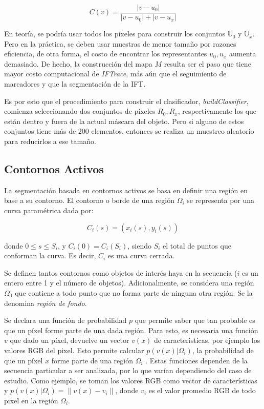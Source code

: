 \begin{equation}
   \label{eq:IFTrace-color-classifier}
   C(v) = \frac{|v - u_{0}|}{|v - u_{0}| + |v - u_{x}|}
\end{equation}

En teoría, se podría usar todos los píxeles para construir los conjuntos
$\mathbb{U}_{0}$ y $\mathbb{U}_{x}$. Pero en la práctica, se deben usar muestras
de menor tamaño por razones eficiencia, de otra forma, el costo de encontrar los
representantes $u_{0},u_{x}$ aumenta demasiado. De hecho, la construcción del mapa
$M$ resulta ser el paso que tiene mayor costo computacional de \textit{IFTrace}, más
aún que el seguimiento de marcadores y que la segmentación de la IFT.

Es por esto que el procedimiento para construir el clasificador,
\textit{buildClassifier}, comienza seleccionando dos conjuntos de píxeles
$R_{0},R_{x}$, respectivamente los que están dentro y fuera de la actual máscara
del objeto. Pero si alguno de estos conjuntos tiene más de 200 elementos,
entonces se realiza un muestreo aleatorio para reducirlos a ese tamaño.

\subsection{Contornos Activos}

La segmentación basada en contornos activos se basa en definir una región en base a su contorno.
El contorno o borde de una región $\Omega_i$ se representa por una curva paramétrica dada por:

\begin{equation}
    C_i(s) = (x_i(s), y_i(s))
\end{equation}

donde $0 \leq s \leq S_i$, y $C_i(0) = C_i(S_i)$, siendo $S_i$ el total de puntos que conforman la curva.
Es decir, $C_i$ es una curva cerrada.

Se definen tantos contornos como objetos de interés haya en la secuencia ($i$ es un entero entre 1 y el número de objetos).
Adicionalmente, se considera una región $\Omega_0$ que contiene a todo punto que no forma parte de ninguna otra región.
Se la denomina \textit{región de fondo}.

Se declara una función de probabilidad $p$ que permite saber que tan probable es que un píxel forme parte de una dada región.
Para esto, es necesaria una función $v$ que dado un píxel, devuelve un vector $v(x)$ de caracteristicas, por ejemplo los valores RGB del pixel.
Esto permite calcular $p(v(x) \vert \Omega_i)$, la probabilidad de que un píxel $x$ forme parte de una región $\Omega_i$ .
Estas funciones dependen de la secuencia particular a ser analizada, por lo que varían dependiendo del caso de estudio.
Como ejemplo, se toman los valores RGB como vector de características y
$p(v(x) \vert \Omega_i) = \| v(x) - v_i \| $, donde $v_i$ es el valor promedio RGB de todo pixel en la región $\Omega_i$.

